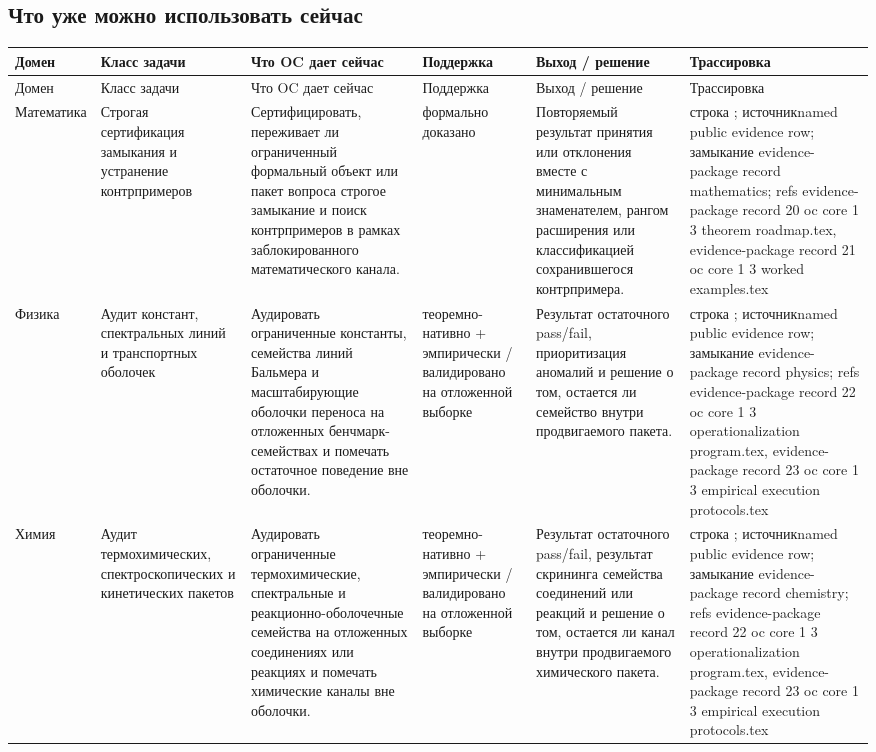 \subsection{Что уже можно использовать сейчас}
\begingroup
\scriptsize
\setlength{\emergencystretch}{1.5em}
\setlength{\tabcolsep}{2pt}
\setlength{\LTleft}{0pt}
\setlength{\LTright}{0pt}
\begin{longtable}{@{}L{0.11\textwidth}L{0.16\textwidth}L{0.19\textwidth}L{0.12\textwidth}L{0.18\textwidth}L{0.16\textwidth}@{}}
\toprule
Домен & Класс задачи & Что OC дает сейчас & Поддержка & Выход / решение & Трассировка \\
\midrule
\endfirsthead
\toprule
Домен & Класс задачи & Что OC дает сейчас & Поддержка & Выход / решение & Трассировка \\
\midrule
\endhead
Математика & Строгая сертификация замыкания и устранение контрпримеров & Сертифицировать, переживает ли ограниченный формальный объект или пакет вопроса строгое замыкание и поиск контрпримеров в рамках заблокированного математического канала. & формально доказано & Повторяемый результат принятия или отклонения вместе с минимальным знаменателем, рангом расширения или классификацией сохранившегося контрпримера. & строка ; \allowbreak источникnamed public evidence row; \allowbreak замыкание evidence-package record mathematics; \allowbreak refs evidence-package record 20 oc core 1 3 theorem roadmap.tex, \allowbreak evidence-package record 21 oc core 1 3 worked examples.tex \\
Физика & Аудит констант, спектральных линий и транспортных оболочек & Аудировать ограниченные константы, семейства линий Бальмера и масштабирующие оболочки переноса на отложенных бенчмарк-семействах и помечать остаточное поведение вне оболочки. & теоремно-нативно + эмпирически / валидировано на отложенной выборке & Результат остаточного pass/fail, приоритизация аномалий и решение о том, остается ли семейство внутри продвигаемого пакета. & строка ; \allowbreak источникnamed public evidence row; \allowbreak замыкание evidence-package record physics; \allowbreak refs evidence-package record 22 oc core 1 3 operationalization program.tex, \allowbreak evidence-package record 23 oc core 1 3 empirical execution protocols.tex \\
Химия & Аудит термохимических, спектроскопических и кинетических пакетов & Аудировать ограниченные термохимические, спектральные и реакционно-оболочечные семейства на отложенных соединениях или реакциях и помечать химические каналы вне оболочки. & теоремно-нативно + эмпирически / валидировано на отложенной выборке & Результат остаточного pass/fail, результат скрининга семейства соединений или реакций и решение о том, остается ли канал внутри продвигаемого химического пакета. & строка ; \allowbreak источникnamed public evidence row; \allowbreak замыкание evidence-package record chemistry; \allowbreak refs evidence-package record 22 oc core 1 3 operationalization program.tex, \allowbreak evidence-package record 23 oc core 1 3 empirical execution protocols.tex \\

\end{longtable}
